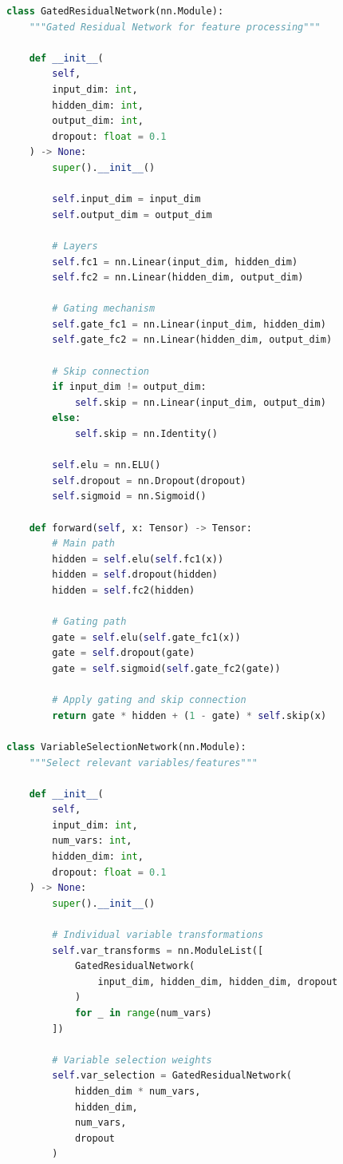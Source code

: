 \documentclass[11pt]{article}
\begin{document}
\begin{lstlisting}[language=Python, caption=Temporal Fusion Transformer Components]
class GatedResidualNetwork(nn.Module):
    """Gated Residual Network for feature processing"""
    
    def __init__(
        self,
        input_dim: int,
        hidden_dim: int,
        output_dim: int,
        dropout: float = 0.1
    ) -> None:
        super().__init__()
        
        self.input_dim = input_dim
        self.output_dim = output_dim
        
        # Layers
        self.fc1 = nn.Linear(input_dim, hidden_dim)
        self.fc2 = nn.Linear(hidden_dim, output_dim)
        
        # Gating mechanism
        self.gate_fc1 = nn.Linear(input_dim, hidden_dim)
        self.gate_fc2 = nn.Linear(hidden_dim, output_dim)
        
        # Skip connection
        if input_dim != output_dim:
            self.skip = nn.Linear(input_dim, output_dim)
        else:
            self.skip = nn.Identity()
        
        self.elu = nn.ELU()
        self.dropout = nn.Dropout(dropout)
        self.sigmoid = nn.Sigmoid()
        
    def forward(self, x: Tensor) -> Tensor:
        # Main path
        hidden = self.elu(self.fc1(x))
        hidden = self.dropout(hidden)
        hidden = self.fc2(hidden)
        
        # Gating path
        gate = self.elu(self.gate_fc1(x))
        gate = self.dropout(gate)
        gate = self.sigmoid(self.gate_fc2(gate))
        
        # Apply gating and skip connection
        return gate * hidden + (1 - gate) * self.skip(x)

class VariableSelectionNetwork(nn.Module):
    """Select relevant variables/features"""
    
    def __init__(
        self,
        input_dim: int,
        num_vars: int,
        hidden_dim: int,
        dropout: float = 0.1
    ) -> None:
        super().__init__()
        
        # Individual variable transformations
        self.var_transforms = nn.ModuleList([
            GatedResidualNetwork(
                input_dim, hidden_dim, hidden_dim, dropout
            )
            for _ in range(num_vars)
        ])
        
        # Variable selection weights
        self.var_selection = GatedResidualNetwork(
            hidden_dim * num_vars,
            hidden_dim,
            num_vars,
            dropout
        )
        

\end{lstlisting}
\end{document}
